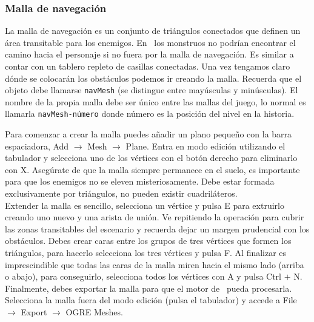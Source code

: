 \documentclass[a4paper,11pt]{article}
\begin{document}


\subsubsection{Malla de navegación}

La malla de navegación es un conjunto de triángulos conectados que definen
un área transitable para los enemigos. En \juego\ los monstruos no podrían
encontrar el camino hacia el personaje si no fuera por la malla de navegación.
Es similar a contar con un tablero repleto de casillas conectadas. Una vez
tengamos claro dónde se colocarán los obstáculos podemos ir creando la malla.
Recuerda que el objeto debe llamarse \texttt{navMesh} (se distingue entre
mayúsculas y minúsculas). El nombre de la propia malla debe ser único
entre las mallas del juego, lo normal es llamarla \texttt{navMesh-número}
donde número es la posición del nivel en la historia.


Para comenzar a crear la malla puedes añadir un plano pequeño con la barra
espaciadora, Add $\rightarrow$ Mesh $\rightarrow$ Plane. Entra en modo edición
utilizando el tabulador y selecciona uno de los vértices con el botón derecho
para eliminarlo con X. Asegúrate de que la malla siempre permanece en el suelo,
es importante para que los enemigos no se eleven misteriosamente. Debe estar
formada exclusivamente por triángulos, no pueden existir cuadriláteros.\\

Extender la malla es sencillo, selecciona un vértice y pulsa E para extruirlo
creando uno nuevo y una arista de unión. Ve repitiendo la operación para
cubrir las zonas transitables del escenario y recuerda dejar un margen
prudencial con los obstáculos. Debes crear caras entre los grupos de tres
vértices que formen los triángulos, para hacerlo selecciona los tres vértices
y pulsa F. Al finalizar es imprescindible que todas las caras de la malla
miren hacia el mismo lado (arriba o abajo), para conseguirlo, selecciona
todos los vértices con A y pulsa Ctrl $+$ N.\\

Finalmente, debes exportar la malla para que el motor de \juego\ pueda
procesarla. Selecciona la malla fuera del modo edición (pulsa el tabulador)
y accede a File $\rightarrow$ Export $\rightarrow$ OGRE Meshes.
\end{document}
